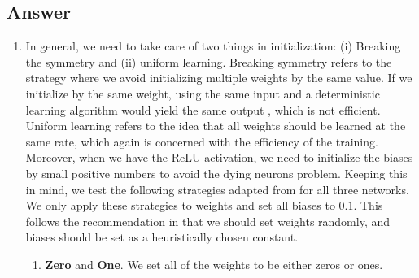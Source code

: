 \documentclass[
	12pt, %
]{../Template/fphw}
\begin{document}

\subsection*{Answer}

\begin{enumerate}[label = (\arabic*)] %
	\item In general, we need to take care of two things in initialization: (i) Breaking the symmetry and (ii) uniform learning. Breaking symmetry refers to the strategy where we avoid initializing multiple weights by the same value. If we initialize by the same weight, using the same input and a deterministic learning algorithm would yield the same output \cite[p298]{Goodfellow-et-al-2016}, which is not efficient.  Uniform learning refers to the idea that all weights should be learned at the same rate, which again is concerned with the efficiency of the training. Moreover, when we have the ReLU activation, we need to initialize the biases by small positive numbers to avoid the dying neurons problem. Keeping this in mind, we test the following strategies adapted from \cite{Hosny2017} for all three networks. We only apply these strategies to weights and set all biases to $0.1$. This follows the recommendation in \cite[p298]{Goodfellow-et-al-2016} that we should set weights randomly, and biases should be set as a heuristically chosen constant.
    \begin{enumerate}
        \item \textbf{Zero} and \textbf{One}. We set all of the weights to be either zeros or ones.
        

\end{enumerate}
\end{enumerate}
\end{document}
